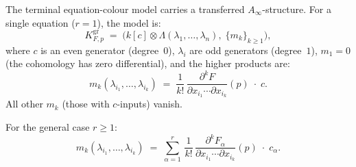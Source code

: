 \begin{construction}
\label{constr:ainfty-jacobi}
The terminal equation-colour model carries a transferred
\(A_\infty\)-structure. For a single equation ($r = 1$), the model is:
\[
K^{\mathrm{gr}}_{F,p}
\;=\; \bigl(k[c] \otimes \Lambda(\lambda_1, \ldots, \lambda_n),\;
\{m_k\}_{k \geq 1}\bigr),
\]
where $c$ is an even generator (degree~$0$), $\lambda_i$ are odd
generators (degree~$1$), $m_1 = 0$ (the cohomology has zero
differential), and the higher products are:
\begin{equation}\label{eq:ainfty-jacobi}
m_k(\lambda_{i_1}, \ldots, \lambda_{i_k})
\;=\; \frac{1}{k!}\,
\frac{\partial^k F}{\partial x_{i_1} \cdots \partial x_{i_k}}(p)
\;\cdot\; c.
\end{equation}
All other $m_k$ (those with $c$-inputs) vanish.

For the general case $r \geq 1$:
\begin{equation}\label{eq:ainfty-jacobi-general}
m_k(\lambda_{i_1}, \ldots, \lambda_{i_k})
\;=\; \sum_{\alpha=1}^r\,
\frac{1}{k!}\,
\frac{\partial^k F_\alpha}{\partial x_{i_1} \cdots \partial x_{i_k}}(p)
\;\cdot\; c_\alpha.
\end{equation}
\end{construction}

